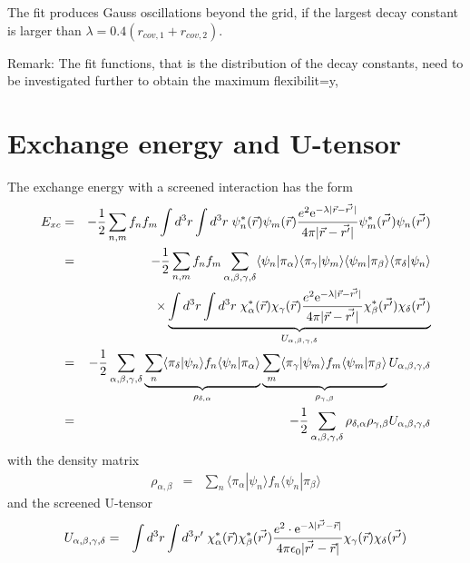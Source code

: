 \documentclass[11pt,a4paper]{report}
\begin{document}
The fit produces Gauss oscillations beyond the grid, if the largest
decay constant is larger than $\lambda=0.4 (r_{cov,1}+r_{cov,2})$.


Remark: The fit functions, that is the distribution of the decay
constants, need to be investigated further to obtain the maximum
flexibilit=y,


\section{Exchange energy and U-tensor}
The exchange energy with a screened interaction has the form
\begin{eqnarray}
E_{xc}&=&-\frac{1}{2}\sum_{n,m}f_nf_m
\int d^3r\int d^3r\;
\psi^*_n(\vec{r})\psi_m(\vec{r})
\frac{e^2\e{-\lambda|\vec{r}-\vec{r'}|}}
{4\pi|\vec{r}-\vec{r'}|}
\psi^*_m(\vec{r'})\psi_n(\vec{r'})
\nonumber\\
%
%
&=&-\frac{1}{2}\sum_{n,m}f_nf_m
\sum_{\alpha,\beta,\gamma,\delta}
\langle\psi_n|\pi_\alpha\rangle
\langle\pi_\gamma|\psi_m\rangle
\langle\psi_m|\pi_\beta\rangle
\langle\pi_\delta|\psi_n\rangle
\nonumber\\
&&\times\underbrace{
\int d^3r\int d^3r\;
\chi^*_\alpha(\vec{r})\chi_\gamma(\vec{r})
\frac{e^2\e{-\lambda|\vec{r}-\vec{r'}|}}
{4\pi|\vec{r}-\vec{r'}|}
\chi^*_\beta(\vec{r'})\chi_\delta(\vec{r'})
}_{U_{\alpha,\beta,\gamma,\delta}}
\nonumber\\
%
%
&=&-\frac{1}{2}
\sum_{\alpha,\beta,\gamma,\delta}
\underbrace{
\sum_n\langle\pi_\delta|\psi_n\rangle f_n\langle\psi_n|\pi_\alpha\rangle
}_{\rho_{\delta,\alpha}}
\underbrace{
\sum_m\langle\pi_\gamma|\psi_m\rangle f_m\langle\psi_m|\pi_\beta\rangle
}_{\rho_{\gamma,\beta}}
U_{\alpha,\beta,\gamma,\delta}
\nonumber\\
%
%
&=&-\frac{1}{2}
\sum_{\alpha,\beta,\gamma,\delta}
\rho_{\delta,\alpha}\rho_{\gamma,\beta}U_{\alpha,\beta,\gamma,\delta}
\end{eqnarray}
with  the density matrix
\begin{eqnarray}
\rho_{\alpha,\beta}&=&
\sum_n\langle\pi_\alpha|\psi_n\rangle f_n\langle\psi_n|\pi_\beta\rangle
\end{eqnarray}
and the screened U-tensor
\begin{eqnarray}
U_{\alpha,\beta,\gamma,\delta}
&=&\int d^3r\int d^3r'\;
\chi^*_\alpha(\vec{r})\chi^*_\beta(\vec{r'})
\frac{e^2\cdot\mathrm{e}^{-\lambda|\vec{r'}-\vec{r}|}}{4\pi\epsilon_0|\vec{r'}-\vec{r}|}
\chi_\gamma(\vec{r})\chi_\delta(\vec{r'})
\end{eqnarray}
\end{document}
